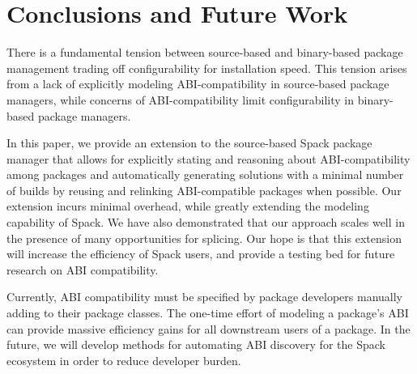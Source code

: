 \section{Conclusions and Future Work}
There is a fundamental tension between source-based and binary-based package
management trading off configurability for installation speed. This tension
arises from a lack of explicitly modeling ABI-compatibility in source-based
package managers, while concerns of ABI-compatibility limit configurability in
binary-based package managers.

In this paper, we provide an extension to the source-based Spack package manager
that allows for explicitly stating and reasoning about ABI-compatibility among
packages and automatically generating solutions with a minimal number of builds
by reusing and relinking ABI-compatible packages when possible. Our extension
incurs minimal overhead, while greatly extending the modeling capability of
Spack. We have also demonstrated that our approach scales well in the presence
of many opportunities for splicing. Our hope is that this extension will increase
the efficiency of Spack users, and provide a testing bed for future research on
ABI compatibility.

Currently, ABI compatibility must be specified by package
developers manually adding  to their package classes. The
one-time effort of modeling a package's ABI can provide massive efficiency gains
for all downstream users of a package. In the future, we will develop methods
for automating ABI discovery for the Spack ecosystem in order to reduce
developer burden.

